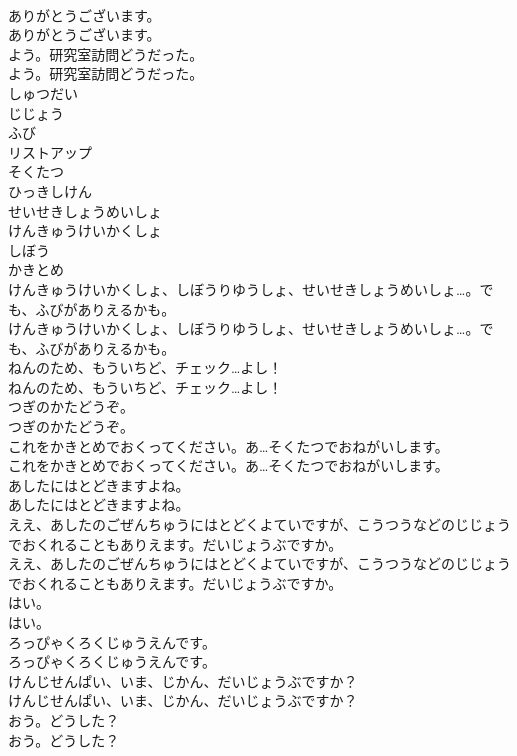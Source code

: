 \documentclass[8pt]{extreport}
\begin{document}
\begin{CJK}{UTF8}{min}
\\	ありがとうございます。
\\	ありがとうございます。
\\	よう。研究室訪問どうだった。
\\	よう。研究室訪問どうだった。
\\	しゅつだい
\\	じじょう
\\	ふび
\\	リストアップ
\\	そくたつ
\\	ひっきしけん
\\	せいせきしょうめいしょ
\\	けんきゅうけいかくしょ
\\	しぼう
\\	かきとめ
\\	けんきゅうけいかくしょ、しぼうりゆうしょ、せいせきしょうめいしょ…。でも、ふびがありえるかも。
\\	けんきゅうけいかくしょ、しぼうりゆうしょ、せいせきしょうめいしょ…。でも、ふびがありえるかも。
\\	ねんのため、もういちど、チェック…よし！
\\	ねんのため、もういちど、チェック…よし！
\\	つぎのかたどうぞ。
\\	つぎのかたどうぞ。
\\	これをかきとめでおくってください。あ…そくたつでおねがいします。
\\	これをかきとめでおくってください。あ…そくたつでおねがいします。
\\	あしたにはとどきますよね。
\\	あしたにはとどきますよね。
\\	ええ、あしたのごぜんちゅうにはとどくよていですが、こうつうなどのじじょうでおくれることもありえます。だいじょうぶですか。
\\	ええ、あしたのごぜんちゅうにはとどくよていですが、こうつうなどのじじょうでおくれることもありえます。だいじょうぶですか。
\\	はい。
\\	はい。
\\	ろっぴゃくろくじゅうえんです。
\\	ろっぴゃくろくじゅうえんです。
\\	けんじせんぱい、いま、じかん、だいじょうぶですか？
\\	けんじせんぱい、いま、じかん、だいじょうぶですか？
\\	おう。どうした？
\\	おう。どうした？

\end{CJK}
\end{document}
